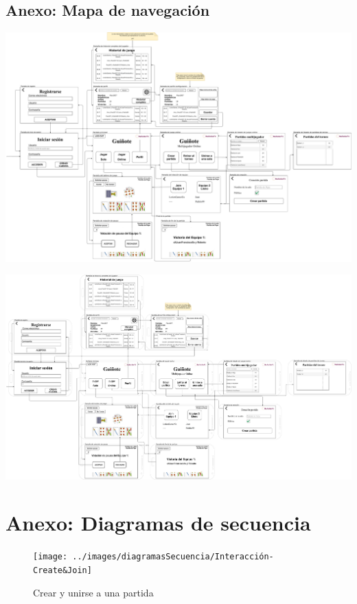 \documentclass{article}
\begin{document}
\begin{landscape}
    \section{Anexo: Mapa de navegación} \label{anexo:navegacion}

    \includegraphics[width=1.5\textwidth]{../images/mapaNavegacion}

    \includegraphics[width=1.5\textwidth]{../images/mapaNavegacionAndroid}

\end{landscape}

\section{Anexo: Diagramas de secuencia}

\begin{figure}[h]
    \centering
    \texttt{[image: ../images/diagramasSecuencia/Interacción-Create\&Join]}
    \caption{Crear y unirse a una partida}
\end{figure}
\end{document}

